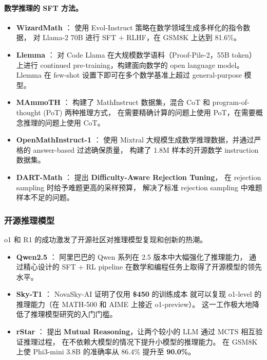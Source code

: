 \paragraph{数学推理的 SFT 方法。}
\begin{itemize}[leftmargin=2em]
  \item \textbf{WizardMath} \cite{luo2023wizardmath}：
    使用 Evol-Instruct 策略在数学领域生成多样化的指令数据，
    对 Llama-2 70B 进行 SFT + RLHF，在 GSM8K 上达到 81.6\%。

  \item \textbf{Llemma} \cite{azerbayev2023llemma}：
    对 Code Llama 在大规模数学语料（Proof-Pile-2，55B token）上进行
    continued pre-training，构建面向数学的 open language model。
    Llemma 在 few-shot 设置下即可在多个数学基准上超过 general-purpose 模型。

  \item \textbf{MAmmoTH} \cite{yue2023mammoth}：
    构建了 MathInstruct 数据集，混合 CoT 和 program-of-thought (PoT) 两种推理方式，
    在需要精确计算的问题上使用 PoT，在需要概念推理的问题上使用 CoT。

  \item \textbf{OpenMathInstruct-1} \cite{toshniwal2024openmath}：
    使用 Mixtral 大规模生成数学推理数据，并通过严格的 answer-based 过滤确保质量，
    构建了 1.8M 样本的开源数学 instruction 数据集。

  \item \textbf{DART-Math} \cite{tong2024dartmath}：
    提出 \textbf{Difficulty-Aware Rejection Tuning}，
    在 rejection sampling 时给予难题更高的采样预算，
    解决了标准 rejection sampling 中难题样本不足的问题。
\end{itemize}

\subsubsection{开源推理模型}

o1 和 R1 的成功激发了开源社区对推理模型复现和创新的热潮。

\begin{itemize}[leftmargin=2em]
  \item \textbf{Qwen2.5} \cite{qwen2024qwen25}：
    阿里巴巴的 Qwen 系列在 2.5 版本中大幅强化了推理能力，
    通过精心设计的 SFT + RL pipeline 在数学和编程任务上取得了开源模型的领先水平。

  \item \textbf{Sky-T1} \cite{novasky2025skyt1}：
    NovaSky-AI 证明了仅用 \textbf{\$450} 的训练成本
    就可以复现 o1-level 的推理能力（在 MATH-500 和 AIME 上接近 o1-preview）。
    这一工作极大地降低了推理模型研究的入门门槛。

  \item \textbf{rStar} \cite{qi2024rstar}：
    提出 \textbf{Mutual Reasoning}，让两个较小的 LLM 通过 MCTS 相互验证推理过程，
    在不依赖大模型的情况下提升小模型的推理能力。
    在 GSM8K 上使 Phi3-mini 3.8B 的准确率从 86.4\% 提升至 \textbf{90.0\%}。
\end{itemize}


